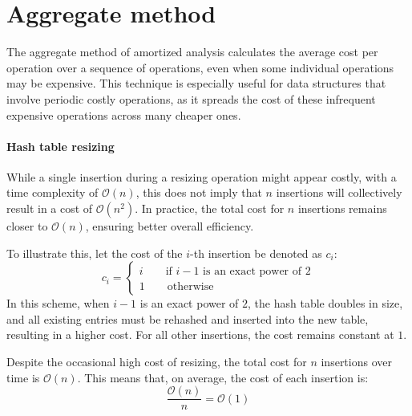 \section{Aggregate method}

The aggregate method of amortized analysis calculates the average cost per operation over a sequence of operations, even when some individual operations may be expensive. 
This technique is especially useful for data structures that involve periodic costly operations, as it spreads the cost of these infrequent expensive operations across many cheaper ones.

\paragraph*{Hash table resizing}
While a single insertion during a resizing operation might appear costly, with a time complexity of $\mathcal{O}(n)$, this does not imply that $n$ insertions will collectively result in a cost of $\mathcal{O}(n^2)$. 
In practice, the total cost for $n$ insertions remains closer to $\mathcal{O}(n)$, ensuring better overall efficiency.

To illustrate this, let the cost of the $i$-th insertion be denoted as $c_i$:
\[c_i=\begin{cases}
    i \qquad\text{if }i - 1 \text{ is an exact power of }2 \\
    1 \qquad\text{otherwise}
\end{cases}\]
In this scheme, when $i - 1$ is an exact power of $2$, the hash table doubles in size, and all existing entries must be rehashed and inserted into the new table, resulting in a higher cost. 
For all other insertions, the cost remains constant at $1$.

Despite the occasional high cost of resizing, the total cost for $n$ insertions over time is $\mathcal{O}(n)$. 
This means that, on average, the cost of each insertion is: 
\[\frac{\mathcal{O}(n)}{n}=\mathcal{O}(1)\]